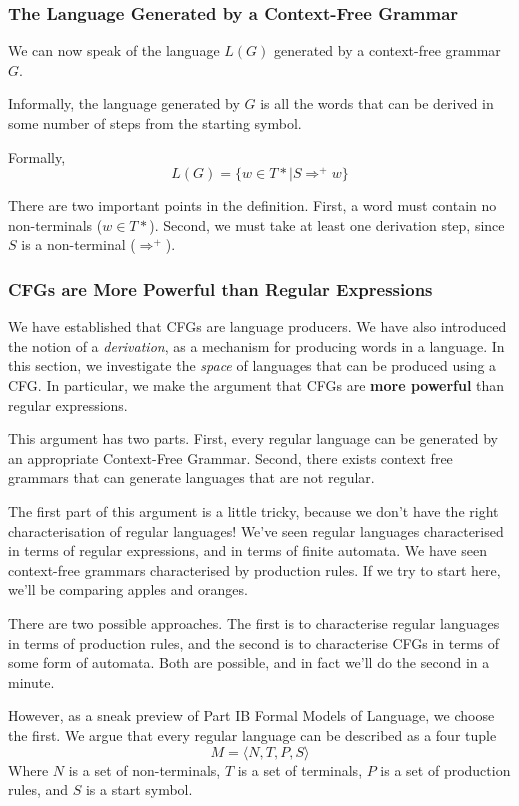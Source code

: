 \subsubsection{The Language Generated by a Context-Free Grammar}
We can now speak of the language $L(G)$ generated by a context-free grammar $G$.

Informally, the language generated by $G$ is all the words that can be derived in some number of steps from the starting symbol. 

Formally, 
\[L(G) = \{w \in T* \mid S \Rightarrow^{+} w \}\]

There are two important points in the definition. First, a word must contain no non-terminals ($w \in T*$). Second, we must take at least one derivation step, since $S$ is a non-terminal ($\Rightarrow^{+}$). 

\subsubsection{CFGs are More Powerful than Regular Expressions}
We have established that CFGs are language producers. We have also introduced the notion of a \textit{derivation}, as a mechanism for producing words in a language. In this section, we investigate the \textit{space} of languages that can be produced using a CFG. In particular, we make the argument that CFGs are \textbf{more powerful} than regular expressions. 

This argument has two parts. First, every regular language can be generated by an appropriate Context-Free Grammar. Second, there exists context free grammars that can generate languages that are not regular. 

The first part of this argument is a little tricky, because we don't have the right characterisation of regular languages! We've seen regular languages characterised in terms of regular expressions, and in terms of finite automata. We have seen context-free grammars characterised by production rules. If we try to start here, we'll be comparing apples and oranges.

There are two possible approaches. The first is to characterise regular languages in terms of production rules, and the second is to characterise CFGs in terms of some form of automata. Both are possible, and in fact we'll do the second in a minute. 

However, as a sneak preview of \textsf{Part IB Formal Models of Language}, we choose the first. We argue that every regular language can be described as a four tuple
\[ M= \langle N, T, P, S \rangle \]
Where $N$ is a set of non-terminals, $T$ is a set of terminals, $P$ is a set of production rules, and $S$ is a start symbol. 

